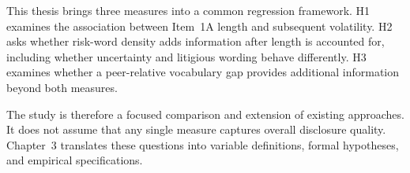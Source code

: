 This thesis brings three measures into a common regression framework. H1
examines the association between Item~1A length and subsequent volatility. H2
asks whether risk-word density adds information after length is accounted for,
including whether uncertainty and litigious wording behave differently. H3
examines whether a peer-relative vocabulary gap provides additional information
beyond both measures.

The study is therefore a focused comparison and extension of existing
approaches. It does not assume that any single measure captures overall
disclosure quality. Chapter~3 translates these questions into variable
definitions, formal hypotheses, and empirical specifications.

